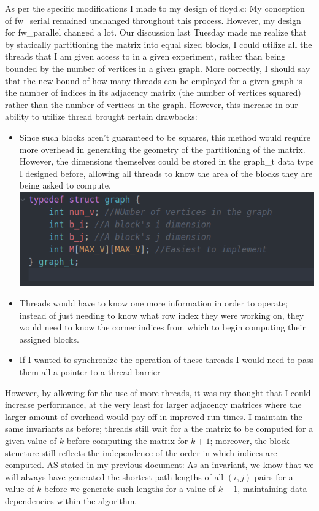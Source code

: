 \documentclass[]{article}
\begin{document}
	As per the specific modifications I made to my design of floyd.c: My conception of fw\_serial remained unchanged throughout this process. However, my design for fw\_parallel changed a lot. Our discussion last Tuesday made me realize that by statically partitioning the matrix into equal sized blocks, I could utilize all the threads that I am given access to in a given experiment, rather than being bounded by the number of vertices in a given graph. More correctly, I should say that the new bound of how many threads can be employed for a given graph is the number of indices in its adjacency matrix (the number of vertices squared) rather than the number of vertices in the graph. However, this increase in our ability to utilize thread brought certain drawbacks: 
	\begin{itemize}
		\item Since such blocks aren't guaranteed to be squares, this method would require more overhead in generating the geometry of the partitioning of the matrix. However, the dimensions themselves could be stored in the graph\_t data type I designed before, allowing all threads to know the area of the blocks they are being asked to compute.
		\\
		\includegraphics[scale=0.5]{code/graph_t.png}
		\item Threads would have to know one more information in order to operate; instead of just needing to know what row index they were working on, they would need to know the corner indices from which to begin computing their assigned blocks. 
		\item If I wanted to synchronize the operation of these threads I would need to pass them all a pointer to a thread barrier
	\end{itemize}
	However, by allowing for the use of more threads, it was my thought that I could increase performance, at the very least for larger adjacency matrices where the larger amount of overhead would pay off in improved run times.
	I maintain the same invariants as before; threads still wait for a the matrix to be computed for a given value of $k$ before computing the matrix for $k + 1$; moreover, the block structure still reflects the independence of the order in which indices are computed. AS stated in my previous document: As an invariant, we know that we will always have generated the shortest path lengths of all $(i,j)$ pairs for a value of $k$ before we generate such lengths for a value of $k + 1$, maintaining data dependencies within the algorithm.
\end{document}
